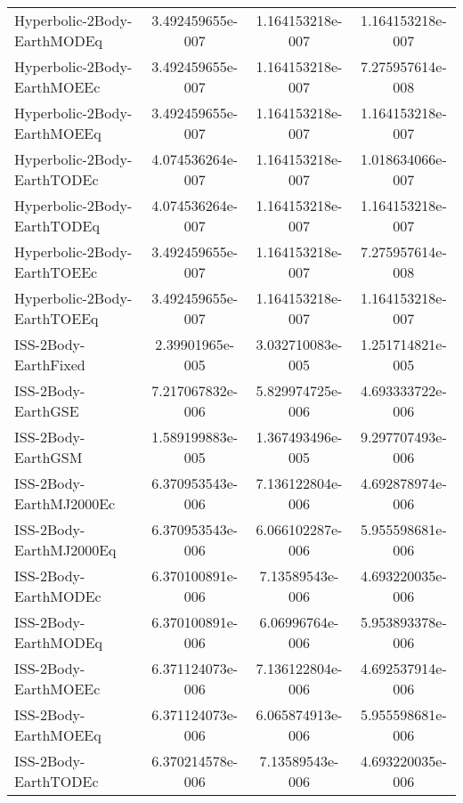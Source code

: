 \begin{table}[htbp!]
\begin{tabular}{lccc}
         Hyperbolic-2Body-EarthMODEq & 3.492459655e-007 & 1.164153218e-007 & 1.164153218e-007 \\
         Hyperbolic-2Body-EarthMOEEc & 3.492459655e-007 & 1.164153218e-007 & 7.275957614e-008 \\
         Hyperbolic-2Body-EarthMOEEq & 3.492459655e-007 & 1.164153218e-007 & 1.164153218e-007 \\
         Hyperbolic-2Body-EarthTODEc & 4.074536264e-007 & 1.164153218e-007 & 1.018634066e-007 \\
         Hyperbolic-2Body-EarthTODEq & 4.074536264e-007 & 1.164153218e-007 & 1.164153218e-007 \\
         Hyperbolic-2Body-EarthTOEEc & 3.492459655e-007 & 1.164153218e-007 & 7.275957614e-008 \\
         Hyperbolic-2Body-EarthTOEEq & 3.492459655e-007 & 1.164153218e-007 & 1.164153218e-007 \\
         ISS-2Body-EarthFixed & 2.39901965e-005 & 3.032710083e-005 & 1.251714821e-005 \\
         ISS-2Body-EarthGSE & 7.217067832e-006 & 5.829974725e-006 & 4.693333722e-006 \\
         ISS-2Body-EarthGSM & 1.589199883e-005 & 1.367493496e-005 & 9.297707493e-006 \\
         ISS-2Body-EarthMJ2000Ec & 6.370953543e-006 & 7.136122804e-006 & 4.692878974e-006 \\
         ISS-2Body-EarthMJ2000Eq & 6.370953543e-006 & 6.066102287e-006 & 5.955598681e-006 \\
         ISS-2Body-EarthMODEc & 6.370100891e-006 & 7.13589543e-006 & 4.693220035e-006 \\
         ISS-2Body-EarthMODEq & 6.370100891e-006 & 6.06996764e-006 & 5.953893378e-006 \\
         ISS-2Body-EarthMOEEc & 6.371124073e-006 & 7.136122804e-006 & 4.692537914e-006 \\
         ISS-2Body-EarthMOEEq & 6.371124073e-006 & 6.065874913e-006 & 5.955598681e-006 \\
         ISS-2Body-EarthTODEc & 6.370214578e-006 & 7.13589543e-006 & 4.693220035e-006 \\

\end{tabular}
\end{table}
